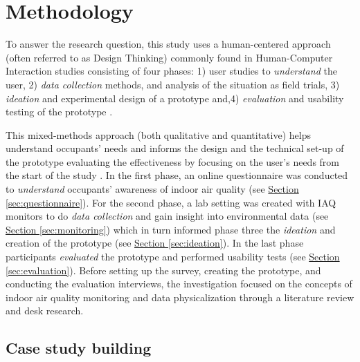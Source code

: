 \section{Methodology}
\label{sec:methodology}

To answer the research question, this study uses a human-centered approach (often referred to as Design Thinking) commonly found in Human-Computer Interaction studies consisting of four phases: 1) user studies to \textit{understand} the user, 2) \textit{data collection} methods, and analysis of the situation as field trials, 3) \textit{ideation} and experimental design of a prototype and,4) \textit{evaluation} and usability testing of the prototype \cite{jonathan_lazar_research_2017, zimmerman_research_2007}.

This mixed-methods approach (both qualitative and quantitative) helps understand occupants' needs and informs the design and the technical set-up of the prototype evaluating the effectiveness by focusing on the user's needs from the start of the study \cite{rogers_moving_2017, experience_ux_2024}. 
In the first phase, an online questionnaire was conducted to \textit{understand} occupants' awareness of indoor air quality (see \hyperref[sec:questionnaire]{Section \ref*{sec:questionnaire}}). For the second phase, a lab setting was created with IAQ monitors to do \textit{data collection} and gain insight into environmental data (see \hyperref[sec:monitoring]{Section \ref*{sec:monitoring}}) which in turn informed phase three the \textit{ideation} and creation of the prototype (see \hyperref[sec:ideation]{Section \ref*{sec:ideation}}). In the last phase participants \textit{evaluated} the prototype and performed usability tests (see \hyperref[sec:evaluation]{Section \ref*{sec:evaluation}}). Before setting up the survey, creating the prototype, and conducting the evaluation interviews, the investigation focused on the concepts of indoor air quality monitoring and data physicalization through a literature review and desk research.

\subsection{Case study building}

